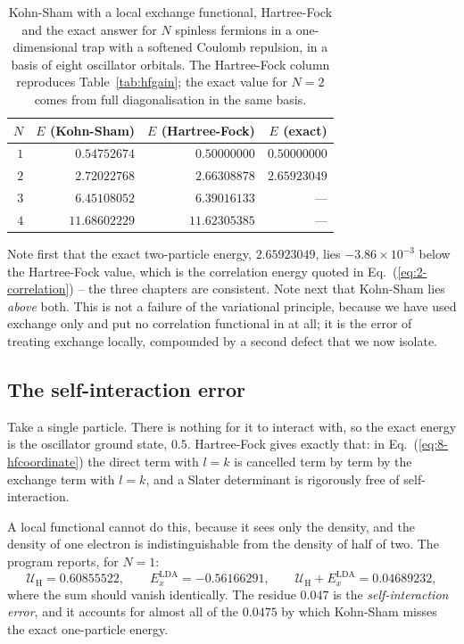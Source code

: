 \begin{table}[h]
\centering
\renewcommand{\arraystretch}{1.25}
\setlength{\tabcolsep}{11pt}
\begin{tabular}{rrrr}
\toprule
$N$ & $E$ (Kohn-Sham) & $E$ (Hartree-Fock) & $E$ (exact)\\
\midrule
$1$ & $0.54752674$  & $0.50000000$  & $0.50000000$\\
$2$ & $2.72022768$  & $2.66308878$  & $2.65923049$\\
$3$ & $6.45108052$  & $6.39016133$  & ---\\
$4$ & $11.68602229$ & $11.62305385$ & ---\\
\bottomrule
\end{tabular}
\caption{Kohn-Sham with a local exchange functional, Hartree-Fock and the
exact answer for $N$ spinless fermions in a one-dimensional trap with a
softened Coulomb repulsion, in a basis of eight oscillator orbitals.  The
Hartree-Fock column reproduces Table~\ref{tab:hfgain}; the exact value for
$N=2$ comes from full diagonalisation in the same basis.}
\label{tab:ksresults}
\end{table}

Note first that the exact two-particle energy, $2.65923049$, lies
$-3.86\times10^{-3}$ below the Hartree-Fock value, which is the correlation
energy quoted in Eq.~(\ref{eq:2-correlation}) -- the three chapters are
consistent.  Note next that Kohn-Sham lies \emph{above} both.  This is not a
failure of the variational principle, because we have used exchange only and
put no correlation functional in at all; it is the error of treating exchange
locally, compounded by a second defect that we now isolate.

\subsection{The self-interaction error}
\label{sec:selfinteraction}

Take a single particle.  There is nothing for it to interact with, so the
exact energy is the oscillator ground state, $0.5$.  Hartree-Fock gives
exactly that: in Eq.~(\ref{eq:8-hfcoordinate}) the direct term with $l=k$ is
cancelled term by term by the exchange term with $l=k$, and a Slater
determinant is rigorously free of self-interaction.

A local functional cannot do this, because it sees only the density, and the
density of one electron is indistinguishable from the density of half of two.
The program reports, for $N=1$:
\begin{equation}
  \mathcal{U}_{\mathrm{H}} = 0.60855522,
  \qquad
  E_x^{\mathrm{LDA}} = -0.56166291,
  \qquad
  \mathcal{U}_{\mathrm{H}} + E_x^{\mathrm{LDA}} = 0.04689232,
  \label{eq:8-sie}
\end{equation}
where the sum should vanish identically.  The residue $0.047$ is the
\emph{self-interaction error}, and it accounts for almost all of the
$0.0475$ by which Kohn-Sham misses the exact one-particle energy.

